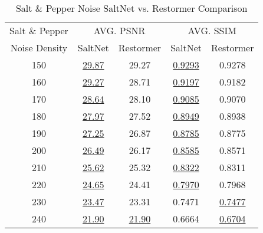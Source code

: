 \begin{table}[!hbt]
    \centering
    \begin{tabular}{ccccc}
        \hline
        Salt \& Pepper & \multicolumn{2}{c}{AVG. PSNR} & \multicolumn{2}{c}{AVG. SSIM} \\
        Noise Density & SaltNet & Restormer & SaltNet & Restormer \\
        \hline
        150 & \underline{29.87} & 29.27 & \underline{0.9293} & 0.9278 \\
        160 & \underline{29.27} & 28.71 & \underline{0.9197} & 0.9182 \\
        170 & \underline{28.64} & 28.10 & \underline{0.9085} & 0.9070 \\
        180 & \underline{27.97} & 27.52 & \underline{0.8949} & 0.8938 \\
        190 & \underline{27.25} & 26.87 & \underline{0.8785} & 0.8775 \\
        200 & \underline{26.49} & 26.17 & \underline{0.8585} & 0.8571 \\
        210 & \underline{25.62} & 25.32 & \underline{0.8322} & 0.8311 \\
        220 & \underline{24.65} & 24.41 & \underline{0.7970} & 0.7968 \\
        230 & \underline{23.47} & 23.31 & 0.7471 & \underline{0.7477} \\
        240 & \underline{21.90} & \underline{21.90} & 0.6664 & \underline{0.6704} \\
        \hline
    \end{tabular}
    \caption{Salt \& Pepper Noise SaltNet vs. Restormer Comparison}
\end{table}